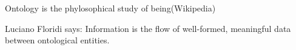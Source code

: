 \documentclass[a4paper]{article}
\title{}
\date{}
\begin{document}
        \maketitle
        
        Ontology is the phylosophical study of being(Wikipedia)
        
        Luciano Floridi says:
        Information is the flow of well-formed, meaningful data between ontological entities.
        
    
\end{document}
